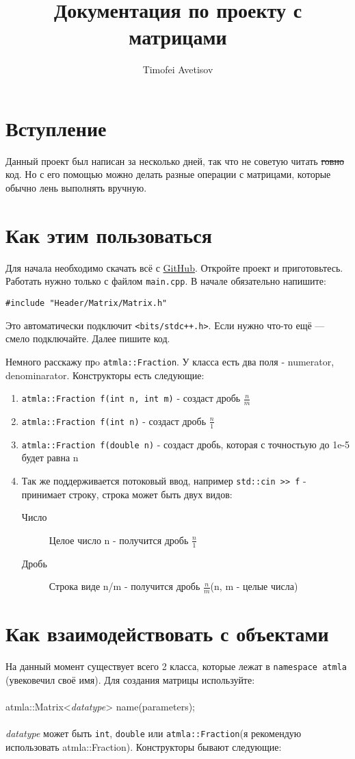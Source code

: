 \documentclass{article}
\title{Документация по проекту с матрицами}
\author{Timofei Avetisov}
\date{}
\begin{document}
\maketitle

\section{Вступление}
Данный проект был написан за несколько дней, так что не советую читать \st{говно} код. Но с его помощью можно делать разные операции с матрицами, которые обычно лень выполнять вручную.

\section{Как этим пользоваться}
Для начала необходимо скачать всё с \href{https://github.com/TimofeiAvetisov/atmla.git}{GitHub}. Откройте проект и приготовьтесь. Работать нужно только с файлом \texttt{main.cpp}. В начале обязательно напишите:
\begin{verbatim}
#include "Header/Matrix/Matrix.h"
\end{verbatim}
Это автоматически подключит \texttt{<bits/stdc++.h>}. Если нужно что-то ещё — смело подключайте. Далее пишите код.

Немного расскажу прo \texttt{atmla::Fraction}. У класса есть два поля - numerator, denominarator. Конструкторы есть следующие:
\begin{enumerate}
    \item \texttt{atmla::Fraction f(int n, int m)} - создаст дробь $\frac{n}{m}$
    \item \texttt{atmla::Fraction f(int n)} - создаст дробь $\frac{n}{1}$
    \item \texttt{atmla::Fraction f(double n)} - создаст дробь, которая с точностьую до 1e-5 будет равна n
    \item Так же поддерживается потоковый ввод, например \texttt{std::cin {>}> f} - принимает строку, строка может быть двух видов:
    \begin{description}
        \item[Число] Целое число n - получится дробь $\frac{n}{1}$
        \item[Дробь] Строка виде {n/m} - получится дробь $\frac{n}{m}$(n, m - целые числа)
    \end{description}
\end{enumerate}

\section{Как взаимодействовать с объектами}
На данный момент существует всего 2 класса, которые лежат в \texttt{namespace atmla} (увековечил своё имя). Для создания матрицы используйте:
\\ \\
atmla::Matrix<{\textit{datatype}}> name(parameters);
\\ \\
\textit{datatype} может быть \texttt{int}, \texttt{double} или \texttt{atmla::Fraction}(я рекомендую использовать atmla::Fraction). Конструкторы бывают следующие:
\end{document}
